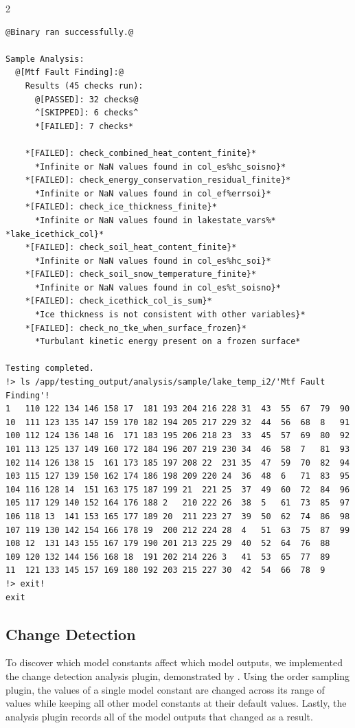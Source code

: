 \documentclass[10pt]{article}
\begin{document}
\begin{multicols}{2}
\begin{lstlisting}
@Binary ran successfully.@

Sample Analysis: 
  @[Mtf Fault Finding]:@
    Results (45 checks run):
      @[PASSED]: 32 checks@
      ^[SKIPPED]: 6 checks^
      *[FAILED]: 7 checks*

    *[FAILED]: check_combined_heat_content_finite}*
      *Infinite or NaN values found in col_es%hc_soisno}*
    *[FAILED]: check_energy_conservation_residual_finite}*
      *Infinite or NaN values found in col_ef%errsoi}*
    *[FAILED]: check_ice_thickness_finite}*
      *Infinite or NaN values found in lakestate_vars%* *lake_icethick_col}*
    *[FAILED]: check_soil_heat_content_finite}*
      *Infinite or NaN values found in col_es%hc_soi}*
    *[FAILED]: check_soil_snow_temperature_finite}*
      *Infinite or NaN values found in col_es%t_soisno}*
    *[FAILED]: check_icethick_col_is_sum}*
      *Ice thickness is not consistent with other variables}*
    *[FAILED]: check_no_tke_when_surface_frozen}*
      *Turbulant kinetic energy present on a frozen surface*

Testing completed.
!> ls /app/testing_output/analysis/sample/lake_temp_i2/'Mtf Fault Finding'!
1   110 122 134 146 158 17  181 193 204 216 228 31  43  55  67  79  90
10  111 123 135 147 159 170 182 194 205 217 229 32  44  56  68  8   91
100 112 124 136 148 16  171 183 195 206 218 23  33  45  57  69  80  92
101 113 125 137 149 160 172 184 196 207 219 230 34  46  58  7   81  93
102 114 126 138 15  161 173 185 197 208 22  231 35  47  59  70  82  94
103 115 127 139 150 162 174 186 198 209 220 24  36  48  6   71  83  95
104 116 128 14  151 163 175 187 199 21  221 25  37  49  60  72  84  96
105 117 129 140 152 164 176 188 2   210 222 26  38  5   61  73  85  97
106 118 13  141 153 165 177 189 20  211 223 27  39  50  62  74  86  98
107 119 130 142 154 166 178 19  200 212 224 28  4   51  63  75  87  99
108 12  131 143 155 167 179 190 201 213 225 29  40  52  64  76  88
109 120 132 144 156 168 18  191 202 214 226 3   41  53  65  77  89
11  121 133 145 157 169 180 192 203 215 227 30  42  54  66  78  9
!> exit!
exit
\end{lstlisting}

\subsection{Change Detection}
To discover which model constants affect which model outputs, we implemented the change detection analysis plugin, demonstrated by . Using the order sampling plugin, the values of a single model constant are changed across its range of values while keeping all other model constants at their default values. Lastly, the analysis plugin records all of the model outputs that changed as a result. 


\end{multicols}
\end{document}
